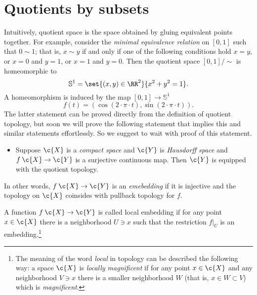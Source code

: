 \section{Quotients by subsets}

Intuitively, quotient space is the space obtained by gluing equivalent points together.
For example, consider the \emph{minimal equivalence relation} on $[0,1]$ such that $0\sim 1$;
that is, $x\sim y$ if and only if one of the following conditions hold $x=y$, or $x=0$ and $y=1$, or $x=1$ and $y=0$.
Then the quotient space $[0,1]/{\sim}$ is homeomorphic to 
\[\mathbb{S}^1=\set{(x,y)\in\RR^2}{x^2+y^2=1}.\]
A homeomorphism is induced by the map $[0,1]\to \mathbb{S}^1$
\[f(t)=\left(\cos(2\cdot\pi\cdot t),\sin(2\cdot\pi\cdot t)\right).\]
The latter statement can be proved directly from the definition of quotient topology, but soon we will prove the following statement that implies this and similar statements effortlessly.
So we suggest to wait with proof of this statement.

\begin{itemize}
\item Suppose $\c{X}$ is a \emph{compact space} and  $\c{Y}$ is \emph{Hausdorff space} and $f\: \c{X}\to\c{Y}$ is a surjective continuous map.
Then $\c{Y}$ is equipped with the quotient topology.
\end{itemize}















In other words, $f\:\c{X}\to \c{Y}$ is an \emph{emebedding} if it is injective and the topology on $\c{X}$ coinsides with pullback topology for $f$.

A function $f\:\c{X}\to \c{Y}$ is called local embedding if for any point $x\in \c{X}$ there is a neighborhood $U\ni x$ such that the restriction $f|_U$ is an embedding.\footnote{The meaning of the word \emph{local} in topology can be described the following way: a space $\c{X}$ is \emph{locally magnificent} if for any point $x\in \c{X}$ and any neighborhood $V\ni x$ there is a smaller neighborhood $W$ (that is, $x\in W\subset V$) which is \emph{magnificent}.}
 
 
 
 
 
 
 
 
 
